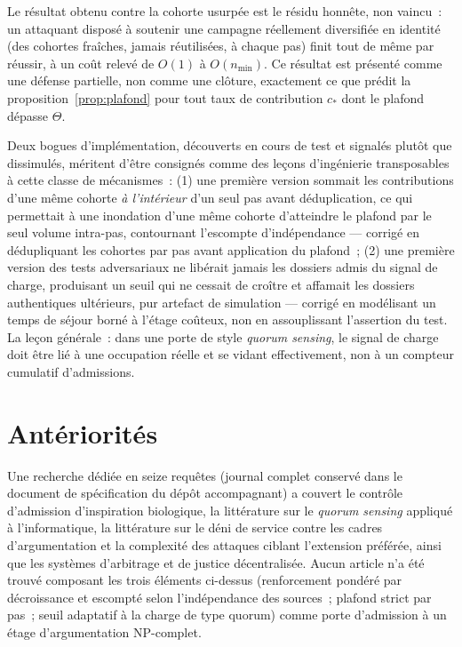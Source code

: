 \documentclass[11pt]{article}
\begin{document}
Le résultat obtenu contre la cohorte usurpée est le résidu honnête, non
vaincu~: un attaquant disposé à soutenir une campagne réellement
diversifiée en identité (des cohortes fraîches, jamais réutilisées, à
chaque pas) finit tout de même par réussir, à un coût relevé de $O(1)$ à
$O(n_{\min})$. Ce résultat est présenté comme une défense partielle, non
comme une clôture, exactement ce que prédit la
proposition~\ref{prop:plafond} pour tout taux de contribution $c_{\ast}$
dont le plafond dépasse $\Theta$.

Deux bogues d'implémentation, découverts en cours de test et signalés
plutôt que dissimulés, méritent d'être consignés comme des leçons
d'ingénierie transposables à cette classe de mécanismes~: (1) une
première version sommait les contributions d'une même cohorte
\emph{à l'intérieur} d'un seul pas avant déduplication, ce qui permettait
à une inondation d'une même cohorte d'atteindre le plafond par le seul
volume intra-pas, contournant l'escompte d'indépendance --- corrigé en
dédupliquant les cohortes par pas avant application du plafond~;
(2) une première version des tests adversariaux ne libérait jamais les
dossiers admis du signal de charge, produisant un seuil qui ne cessait de
croître et affamait les dossiers authentiques ultérieurs, pur artefact de
simulation --- corrigé en modélisant un temps de séjour borné à l'étage
coûteux, non en assouplissant l'assertion du test. La leçon générale~:
dans une porte de style \emph{quorum sensing}, le signal de charge doit
être lié à une occupation réelle et se vidant effectivement, non à un
compteur cumulatif d'admissions.

\section{Antériorités}
\label{sec:priorart}

Une recherche dédiée en seize requêtes (journal complet conservé dans le
document de spécification du dépôt accompagnant) a couvert le contrôle
d'admission d'inspiration biologique, la littérature sur le
\emph{quorum sensing} appliqué à l'informatique, la littérature sur le
déni de service contre les cadres d'argumentation et la complexité des
attaques ciblant l'extension préférée, ainsi que les systèmes
d'arbitrage et de justice décentralisée. Aucun article n'a été trouvé
composant les trois éléments ci-dessus (renforcement pondéré par
décroissance et escompté selon l'indépendance des sources~; plafond
strict par pas~; seuil adaptatif à la charge de type quorum) comme porte
d'admission à un étage d'argumentation NP-complet.
\end{document}
